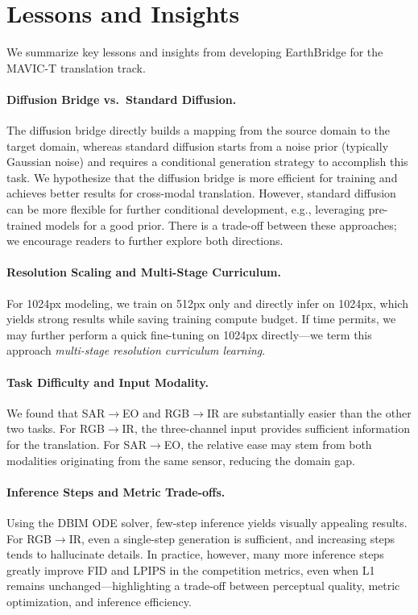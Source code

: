 \section{Lessons and Insights}
\label{sec:suppl_lessons}

We summarize key lessons and insights from developing EarthBridge for the MAVIC-T translation track.

\paragraph{Diffusion Bridge vs.\ Standard Diffusion.}
The diffusion bridge directly builds a mapping from the source domain to the target domain, whereas standard diffusion starts from a noise prior (typically Gaussian noise) and requires a conditional generation strategy to accomplish this task. We hypothesize that the diffusion bridge is more efficient for training and achieves better results for cross-modal translation. However, standard diffusion can be more flexible for further conditional development, e.g., leveraging pre-trained models for a good prior. There is a trade-off between these approaches; we encourage readers to further explore both directions.

\paragraph{Resolution Scaling and Multi-Stage Curriculum.}
For 1024px modeling, we train on 512px only and directly infer on 1024px, which yields strong results while saving training compute budget. If time permits, we may further perform a quick fine-tuning on 1024px directly---we term this approach \emph{multi-stage resolution curriculum learning}.

\paragraph{Task Difficulty and Input Modality.}
We found that SAR$\rightarrow$EO and RGB$\rightarrow$IR are substantially easier than the other two tasks. For RGB$\rightarrow$IR, the three-channel input provides sufficient information for the translation. For SAR$\rightarrow$EO, the relative ease may stem from both modalities originating from the same sensor, reducing the domain gap.

\paragraph{Inference Steps and Metric Trade-offs.}
Using the DBIM ODE solver, few-step inference yields visually appealing results. For RGB$\rightarrow$IR, even a single-step generation is sufficient, and increasing steps tends to hallucinate details. In practice, however, many more inference steps greatly improve FID and LPIPS in the competition metrics, even when L1 remains unchanged---highlighting a trade-off between perceptual quality, metric optimization, and inference efficiency.

\hypersetup{pageanchor=true}
